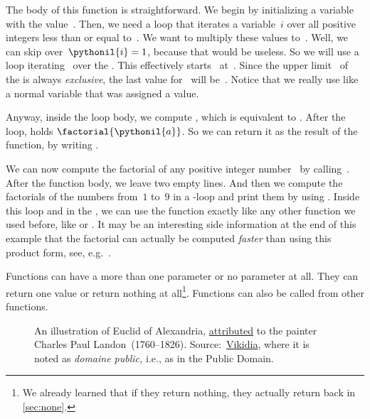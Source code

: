 The body of this function is straightforward.
We begin by initializing a variable  with the value~.
Then, we need a loop that iterates a variable~$i$ over all positive integers less than or equal to~.
We want to multiply these values to~.
Well, we can skip over~$\pythonil{i}=1$, because that would be useless.
So we will use a  loop iterating~ over the .
This effectively starts~ at~.
Since the upper limit~ of the  is always \emph{exclusive}, the last value for~ will be~.
Notice that we really use  like a normal variable that was assigned a value.%
%
\begin{sloppypar}%
Anyway, inside the loop body, we compute \pythonIdx{*=}, which is equivalent to .
After the loop,  holds $\factorial{\pythonil{a}}$.
So we can return it as the result of the function, by writing .%
\end{sloppypar}%
%
We can now compute the factorial of any positive integer number~ by calling~.
After the function body, we leave two empty lines.
And then we compute the factorials of the numbers from~$1$ to~$9$ in a -loop and print them by using .
Inside this loop and in the , we can use the function  exactly like any other function we used before, like  or .
It may be an interesting side information at the end of this example that the factorial can actually be computed \emph{faster} than using this product form, see, e.g.~\cite{L2015ANKOFF}.

Functions can have a more than one parameter or no parameter at all.
They can return one value or return nothing at all\footnote{%
We already learned that if they return nothing, they actually return  back in \cref{sec:none}.%
}.
Functions can also be called from other functions.

\begin{figure}%
\centering%
%
\caption{An illustration of Euclid of Alexandria, \href{https://www.antike-griechische.de/Euklid.pdf}{attributed} to the painter Charles Paul Landon~(1760--1826). Source:~\href{https://fr.vikidia.org/wiki/Cat\%C3\%A9gorie:Image_Euclide}{Vikidia}, where it is noted as \emph{domaine public,} i.e., as in the Public Domain.}%
\label{fig:euclidOfAlexandria}%
\end{figure}%
%
%
%

